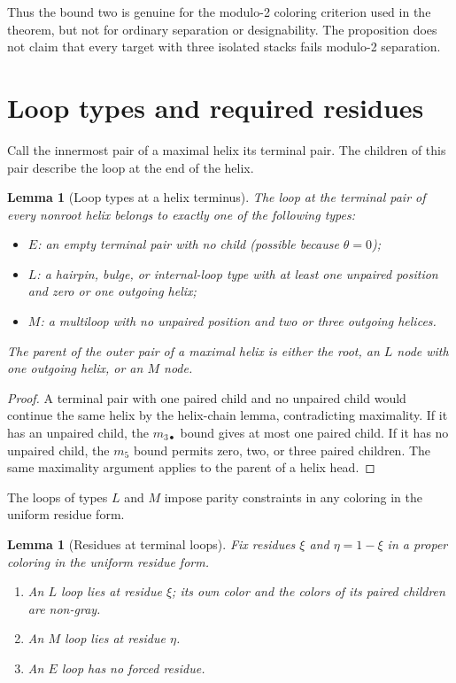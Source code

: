 \documentclass[11pt]{article}
\newtheorem{lemma}[theorem]{Lemma}
\begin{document}
Thus the bound two is genuine for the modulo-2 coloring criterion used in the theorem, but not for ordinary separation or designability.  The proposition does not claim that every target with three isolated stacks fails modulo-2 separation.

\section{Loop types and required residues}
\label{sec:structural}

Call the innermost pair of a maximal helix its terminal pair.  The children of this pair describe the loop at the end of the helix.

\begin{lemma}[Loop types at a helix terminus]
\label{lem:endpoint-taxonomy}
The loop at the terminal pair of every nonroot helix belongs to exactly one of the following types:
\begin{itemize}
\item $E$: an empty terminal pair with no child (possible because $\theta=0$);
\item $L$: a hairpin, bulge, or internal-loop type with at least one unpaired position and zero or one outgoing helix;
\item $M$: a multiloop with no unpaired position and two or three outgoing helices.
\end{itemize}
The parent of the outer pair of a maximal helix is either the root, an $L$ node with one outgoing helix, or an $M$ node.
\end{lemma}

\begin{proof}
A terminal pair with one paired child and no unpaired child would continue the same helix by the helix-chain lemma, contradicting maximality.  If it has an unpaired child, the $m_{3\bullet}$ bound gives at most one paired child.  If it has no unpaired child, the $m_5$ bound permits zero, two, or three paired children.  The same maximality argument applies to the parent of a helix head.
\end{proof}

The loops of types $L$ and $M$ impose parity constraints in any coloring in the uniform residue form.

\begin{lemma}[Residues at terminal loops]
\label{lem:forced-residues}
Fix residues $\xi$ and $\eta=1-\xi$ in a proper coloring in the uniform residue form.
\begin{enumerate}
\item An $L$ loop lies at residue $\xi$; its own color and the colors of its paired children are non-gray.
\item An $M$ loop lies at residue $\eta$.
\item An $E$ loop has no forced residue.
\end{enumerate}
\end{lemma}
\end{document}
